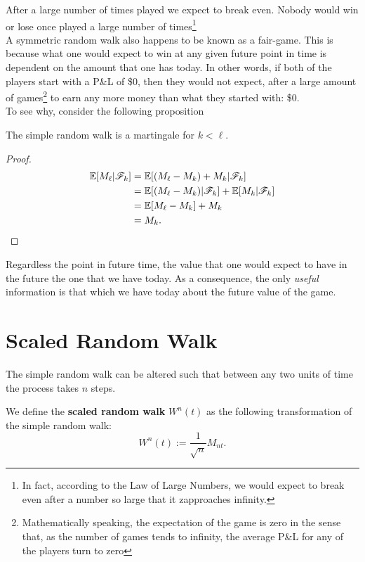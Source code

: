 \documentclass[../TGMAFFIRO]{subfiles}
\begin{document}
After a large number of times played we expect to break even. Nobody would win or lose once played a large number of times\footnote{In fact, according to the Law of Large Numbers, we would expect to break even after a number so large that it zapproaches infinity.}\\

A symmetric random walk also happens to be known as a fair-game. This is because what one would expect to win at any given future point in time is dependent on the amount that one has today. In other words, if both of the players start with a P\&L of \$0, then they would not expect, after a large amount of games\footnote{Mathematically speaking, the expectation of the game is zero in the sense that, as the number of games tends to infinity, the average P\&L for any of the players turn to zero} to earn any more money than what they started with: \$0.\\

To see why, consider the following proposition

\begin{proposition}
	The simple random walk is a martingale for $k < \ell$.
\end{proposition}

\begin{proof}
	\begin{align*}
				\mathbb{E}[M_\ell|\mathscr{F}_k] &= \mathbb{E}[(M_\ell - M_k) + M_k | \mathscr{F}_k] \\
				&= \mathbb{E}[(M_\ell - M_k) | \mathscr{F}_k] + \mathbb{E}[M_k | \mathscr{F}_k] \\
				&= \mathbb{E}[M_\ell - M_k] + M_k\\
				&= M_k.
	\end{align*}
\end{proof}

Regardless the point in future time, the value that one would expect to have in the future the one that we have today. As a consequence, the only \textit{useful} information is that which we have today about the future value of the game.

\section{Scaled Random Walk}
The simple random walk can be altered such that between any two units of time the process takes $n$ steps.

\begin{definition}
	We define the \textbf{scaled random walk} $W^n(t)$ as the following transformation of the simple random walk:
	\[W^n(t) := \frac{1}{\sqrt{n}}M_{nt}.\]
\end{definition}
\end{document}
